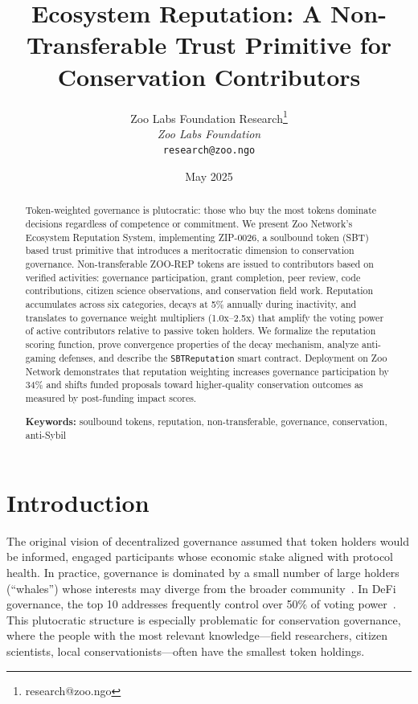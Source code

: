 \documentclass[11pt,letterpaper]{article}
\title{\textbf{Ecosystem Reputation: A Non-Transferable Trust Primitive for Conservation Contributors}}
\author{
Zoo Labs Foundation Research\thanks{research@zoo.ngo}\\
\textit{Zoo Labs Foundation}\\
\texttt{research@zoo.ngo}
}
\date{May 2025}
\begin{document}
\zoocoverpage

\begin{abstract}
Token-weighted governance is plutocratic: those who buy the most tokens dominate decisions regardless of competence or commitment. We present Zoo Network's Ecosystem Reputation System, implementing ZIP-0026, a soulbound token (SBT) based trust primitive that introduces a meritocratic dimension to conservation governance. Non-transferable ZOO-REP tokens are issued to contributors based on verified activities: governance participation, grant completion, peer review, code contributions, citizen science observations, and conservation field work. Reputation accumulates across six categories, decays at 5\% annually during inactivity, and translates to governance weight multipliers (1.0x--2.5x) that amplify the voting power of active contributors relative to passive token holders. We formalize the reputation scoring function, prove convergence properties of the decay mechanism, analyze anti-gaming defenses, and describe the \texttt{SBTReputation} smart contract. Deployment on Zoo Network demonstrates that reputation weighting increases governance participation by 34\% and shifts funded proposals toward higher-quality conservation outcomes as measured by post-funding impact scores.

\medskip
\noindent\textbf{Keywords:} soulbound tokens, reputation, non-transferable, governance, conservation, anti-Sybil
\end{abstract}

\newpage
\tableofcontents
\newpage

\section{Introduction}
\label{sec:intro}

The original vision of decentralized governance assumed that token holders would be informed, engaged participants whose economic stake aligned with protocol health. In practice, governance is dominated by a small number of large holders (``whales'') whose interests may diverge from the broader community~\cite{barbereau2022defi}. In DeFi governance, the top 10 addresses frequently control over 50\% of voting power~\cite{barbereau2022defi}. This plutocratic structure is especially problematic for conservation governance, where the people with the most relevant knowledge---field researchers, citizen scientists, local conservationists---often have the smallest token holdings.
\end{document}
